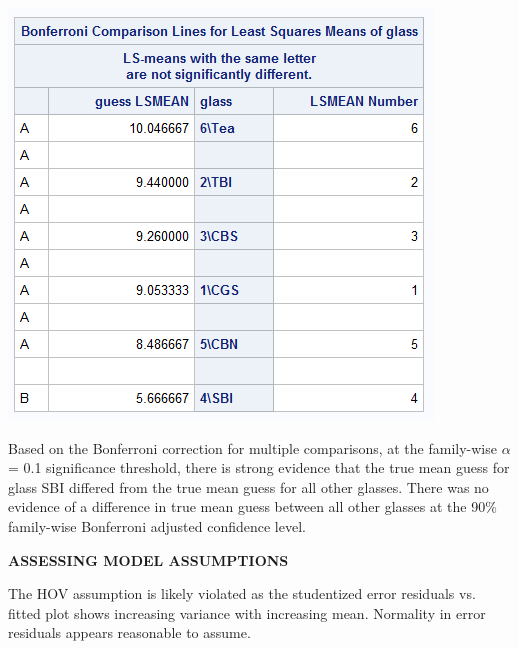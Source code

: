 \documentclass{article}\usepackage[]{graphicx}\usepackage[]{color}
\begin{document}
\begin{enumerate}
\begin{enumerate}
\includegraphics{cldglasses}

Based on the Bonferroni correction for multiple comparisons, at the family-wise $\alpha$ = 0.1 significance threshold, there is strong evidence that the true mean guess for glass SBI differed from the true mean guess for all other glasses. There was no evidence of a difference in true mean guess between all other glasses at the 90\% family-wise Bonferroni adjusted confidence level.

{\bf ASSESSING MODEL ASSUMPTIONS}

The HOV assumption is likely violated as the studentized error residuals vs. fitted plot shows increasing variance with increasing mean. Normality in error residuals appears reasonable to assume.


\end{enumerate}
\end{enumerate}
\end{document}
